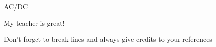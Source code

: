 \documentclass[12pt]{article}
\title{ \Titulo}
\author{\Autor}
\date{\Data}
\begin{document}

    
        AC/DC 
        
        My teacher is great!

        
        
Don't forget to break lines and always give credits to your references
    
    
    
\end{document}
